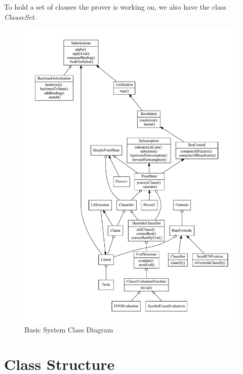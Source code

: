 \documentclass{llncs}
\begin{document}
To hold a set of clauses the prover is working on, we also have the
class \emph{ClauseSet}.

\begin{figure}
  \centering
  \includegraphics[width=6in]{architecture.pdf}
  \caption{Basic System Class Diagram}
  \label{fig:SysArch}
\end{figure}

\section{Class Structure}
\end{document}
